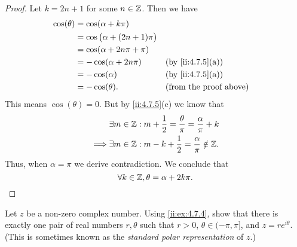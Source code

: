 \begin{proof}
  Let \(k = 2n + 1\) for some \(n \in \mathbb{Z}\).
  Then we have
  \begin{align*}
    \cos(\theta) & = \cos(\alpha + k \pi)                                                   \\
                 & = \cos\big(\alpha + (2n + 1) \pi\big)                                    \\
                 & = \cos(\alpha + 2 n \pi + \pi)                                           \\
                 & = -\cos(\alpha + 2 n \pi)             &  & \by{ii:4.7.5}[a]              \\
                 & = -\cos(\alpha)                       &  & \by{ii:4.7.5}[a]              \\
                 & = -\cos(\theta).                      &  & \text{(from the proof above)}
  \end{align*}
  This means \(\cos(\theta) = 0\).
  But by \cref{ii:4.7.5}(c) we know that
  \begin{align*}
             & \exists m \in \mathbb{Z} : m + \dfrac{1}{2} = \dfrac{\theta}{\pi} = \dfrac{\alpha}{\pi} + k \\
    \implies & \exists m \in \mathbb{Z} : m - k + \dfrac{1}{2} = \dfrac{\alpha}{\pi} \notin \mathbb{Z}.
  \end{align*}
  Thus, when \(\alpha = \pi\) we derive contradiction.
  We conclude that
  \[
    \forall k \in \mathbb{Z}, \theta = \alpha + 2 k \pi.
  \]
\end{proof}

\begin{ex}\label{ii:ex:4.7.6}
  Let \(z\) be a non-zero complex number.
  Using \cref{ii:ex:4.7.4}, show that there is exactly one pair of real numbers \(r, \theta\) such that \(r > 0\), \(\theta \in (-\pi, \pi]\), and \(z = r e^{i \theta}\).
  (This is sometimes known as the \emph{standard polar representation} of \(z\).)
\end{ex}

